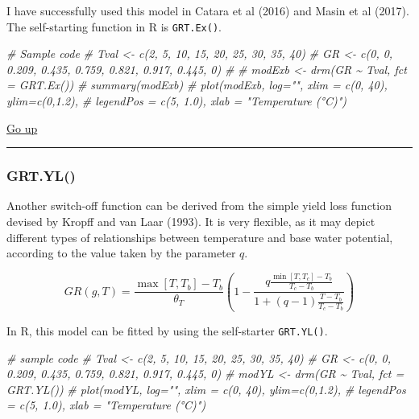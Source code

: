 \documentclass[
]{book}
\newenvironment{Shaded}{\begin{snugshade}}{\end{snugshade}}
\newcommand{\CommentTok}[1]{\textcolor[rgb]{0.56,0.35,0.01}{\textit{#1}}}
\begin{document}
I have successfully used this model in Catara et al (2016) and Masin et al (2017). The self-starting function in R is \texttt{GRT.Ex()}.

\begin{Shaded}
\begin{Highlighting}[]
\CommentTok{\# Sample code}
\CommentTok{\# Tval \textless{}{-} c(2, 5, 10, 15, 20, 25, 30, 35, 40)}
\CommentTok{\# GR \textless{}{-} c(0, 0, 0.209, 0.435, 0.759, 0.821, 0.917, 0.445, 0)}
\CommentTok{\# }
\CommentTok{\# modExb \textless{}{-} drm(GR \textasciitilde{} Tval, fct = GRT.Ex())}
\CommentTok{\# summary(modExb)}
\CommentTok{\# plot(modExb, log="", xlim = c(0, 40), ylim=c(0,1.2),}
\CommentTok{\#     legendPos = c(5, 1.0), xlab = "Temperature (°C)")}
\end{Highlighting}
\end{Shaded}

\protect\hyperlink{a-possibly-incomplete-list-of-threshold-models}{Go up}

\begin{center}\rule{0.5\linewidth}{0.5pt}\end{center}

\hypertarget{grt.yl}{%
\subsubsection{GRT.YL()}\label{grt.yl}}

Another switch-off function can be derived from the simple yield loss function devised by Kropff and van Laar (1993). It is very flexible, as it may depict different types of relationships between temperature and base water potential, according to the value taken by the parameter \(q\).

\[GR(g, T) = \frac{\max \left[T, T_b\right] - T_b}{\theta_T} \left( 1 - \frac{q \frac{\min \left[T, T_c\right] -T_b}{T_c- T_b} }{1 + (q-1) \frac{T-T_b}{T_c- T_b}}  \right)\]

In R, this model can be fitted by using the self-starter \texttt{GRT.YL()}.

\begin{Shaded}
\begin{Highlighting}[]
\CommentTok{\# sample code}
\CommentTok{\# Tval \textless{}{-} c(2, 5, 10, 15, 20, 25, 30, 35, 40)}
\CommentTok{\# GR \textless{}{-} c(0, 0, 0.209, 0.435, 0.759, 0.821, 0.917, 0.445, 0)}
\CommentTok{\# modYL \textless{}{-} drm(GR \textasciitilde{} Tval, fct = GRT.YL())}
\CommentTok{\# plot(modYL, log="", xlim = c(0, 40), ylim=c(0,1.2),}
\CommentTok{\#      legendPos = c(5, 1.0), xlab = "Temperature (°C)")}
\end{Highlighting}
\end{Shaded}
\end{document}
